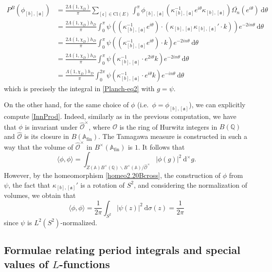 \documentclass[11pt]{amsart}
\newcommand{\bigo}{\mathcal{O}}
\newcommand{\Q}{\mathbb{Q}}
\newcommand{\A}{\mathbb{A}}
\renewcommand{\a}{\mathfrak{a}}
\theoremstyle{definition}
\theoremstyle{remark}
\begin{document}
\begin{align*}
    P^{B}(\phi_{[b], [\a]}) &= \frac{2\Lambda(1,\chi_{D})}{\pi} \sum_{[\mathfrak{c}] \in \mathrm{Cl}(E)} \int_{0}^{\pi} \phi_{[b], [\a]}\left( \kappa_{[b],[\a]}^{-1} e^{i\theta} \kappa_{[b],[\a]} \right) \overline{\Omega_{n}}\left( e^{i\theta} \right) \: \mathrm{d}\theta \\
    &= \frac{2\Lambda(1,\chi_{D}) h_D}{\pi} \int_{0}^{\pi} \psi\left( \left(\kappa_{[b],[\a]}^{-1} e^{i\theta}\right) \cdot (\kappa_{[b],[\a]} \kappa_{[b],[\a]}' \cdot k) \right) e^{-2in\theta} \: \mathrm{d}\theta \\
    &= \frac{2\Lambda(1,\chi_{D}) h_D}{\pi} \int_{0}^{\pi} \psi\left( \left(\kappa_{[b],[\a]}^{-1} e^{i\theta}\right) \cdot k \right) e^{-2in\theta} \: \mathrm{d}\theta \\
    &= \frac{2\Lambda(1,\chi_{D}) h_D}{\pi} \int_{0}^{\pi} \psi\left( \kappa_{[b],[\a]}^{-1} \cdot e^{2i\theta} k \right) e^{-2in\theta} \: \mathrm{d}\theta \\
    &= \frac{\Lambda(1,\chi_{D}) h_D}{\pi} \int_{0}^{2\pi} \psi\left( \kappa_{[b],[\a]}^{-1} \cdot e^{i\theta} k \right) e^{-in\theta} \: \mathrm{d}\theta
\end{align*}
which is precisely the integral in \eqref{Planch-eq2} with $g=\psi$.

On the other hand, for the same choice of $\phi$ (i.e.~$\phi = \phi_{[b], [\a]}$), we can explicitly compute \eqref{InnProd}. Indeed, similarly as in the previous computation, we have that $\phi$ is invariant under $\widehat{\bigo}^{\times}$, where $\bigo$ is the ring of Hurwitz integers in $B(\Q)$ and $\widehat{\bigo}$ is its closure in $B(\A_{\text{fin}})$. The Tamagawa measure is constructed in such a way that the volume of $\widehat{\bigo}^{\times}$ in $B^{\times}(\A_{\text{fin}})$ is $1$. It follows that $$ \langle \phi , \phi \rangle = \int_{Z(\A) B^{\times}(\Q) \backslash B^{\times}(\A) / \widehat{\bigo}^{\times}} |\phi(g)|^{2} \: \mathrm{d}^{\times}g.$$ However, by the homeomorphism \eqref{homeo2.20Bcross}, the construction of $\phi$ from $\psi$, the fact that $\kappa_{[b], [\a]}'$ is a rotation of $S^2$, and considering the normalization of volumes, we obtain that $$ \langle \phi, \phi\rangle = \frac{1}{2\pi} \int_{S^2} |\psi(z)|^{2} \: \mathrm{d}\sigma(z) = \frac{1}{2\pi}$$ since $\psi$ is $L^2(S^2)$-normalized.




\subsection{Formulae relating period integrals and special values of \texorpdfstring{$L$}{L}-functions}
\end{document}
